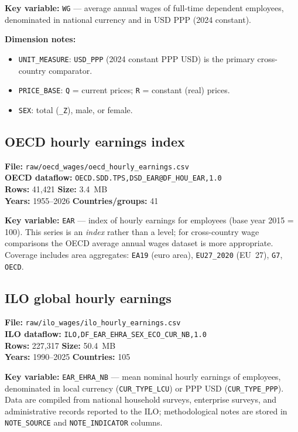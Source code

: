 \documentclass[11pt,a4paper]{article}
\newcommand{\code}[1]{\texttt{#1}}
\begin{document}
\noindent\textbf{Key variable:} \code{WG} --- average annual wages of full-time dependent employees, denominated in national currency and in USD PPP (2024 constant).

\noindent\textbf{Dimension notes:}
\begin{itemize}[noitemsep]
    \item \texttt{UNIT\_MEASURE}: \texttt{USD\_PPP} (2024 constant PPP USD) is the primary cross-country comparator.
    \item \texttt{PRICE\_BASE}: \texttt{Q} = current prices; \texttt{R} = constant (real) prices.
    \item \texttt{SEX}: total (\texttt{\_Z}), male, or female.
\end{itemize}

\subsection{OECD hourly earnings index}

\textbf{File:} \texttt{raw/oecd\_wages/oecd\_hourly\_earnings.csv}\\
\textbf{OECD dataflow:} \texttt{OECD.SDD.TPS,DSD\_EAR@DF\_HOU\_EAR,1.0}\\
\textbf{Rows:} 41{,}421 \quad \textbf{Size:} 3.4~MB\\
\textbf{Years:} 1955--2026 \quad \textbf{Countries/groups:} 41

\noindent\textbf{Key variable:} \code{EAR} --- index of hourly earnings for employees (base year 2015 = 100).  This series is an \emph{index} rather than a level; for cross-country wage comparisons the OECD average annual wages dataset is more appropriate.  Coverage includes area aggregates: \texttt{EA19} (euro area), \texttt{EU27\_2020} (EU~27), \texttt{G7}, \texttt{OECD}.

\subsection{ILO global hourly earnings}

\textbf{File:} \texttt{raw/ilo\_wages/ilo\_hourly\_earnings.csv}\\
\textbf{ILO dataflow:} \texttt{ILO,DF\_EAR\_EHRA\_SEX\_ECO\_CUR\_NB,1.0}\\
\textbf{Rows:} 227{,}317 \quad \textbf{Size:} 50.4~MB\\
\textbf{Years:} 1990--2025 \quad \textbf{Countries:} 105

\noindent\textbf{Key variable:} \code{EAR\_EHRA\_NB} --- mean nominal hourly earnings of employees, denominated in local currency (\texttt{CUR\_TYPE\_LCU}) or PPP USD (\texttt{CUR\_TYPE\_PPP}).  Data are compiled from national household surveys, enterprise surveys, and administrative records reported to the ILO; methodological notes are stored in \texttt{NOTE\_SOURCE} and \texttt{NOTE\_INDICATOR} columns.
\end{document}
